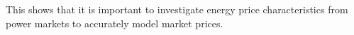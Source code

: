 This shows that it is important to investigate energy price characteristics from power markets to accurately model market prices. 




%
%
%
%





